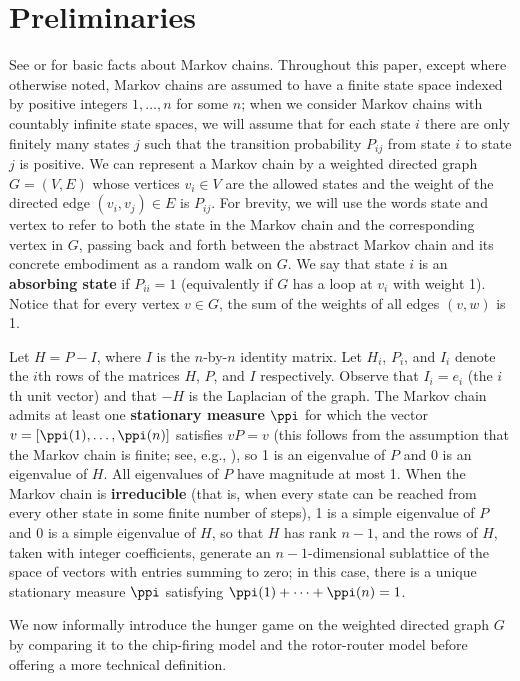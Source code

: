 \section{Preliminaries}\label{section: preliminaries}
See \cite{kemenysnell1983} or \cite{norris1998markov}
for basic facts about Markov chains.
Throughout this paper, except where otherwise noted, 
Markov chains are assumed to have a finite state space
indexed by positive integers $1,\dots,n$ for some $n$; 
when we consider Markov chains with countably infinite state spaces, 
we will assume that for each state $i$
there are only finitely many states $j$ such that 
the transition probability $P_{ij}$ from state $i$ to state $j$ is positive.
We can represent a Markov chain by a weighted directed graph $G=(V,E)$ 
whose vertices $v_i \in V$ are the allowed states 
and the weight of the directed edge $(v_i,v_j) \in E$ is $P_{ij}$.
For brevity, we will use the words state and vertex to refer to 
both the state in the Markov chain and the corresponding vertex in $G$,
passing back and forth between the abstract Markov chain
and its concrete embodiment as a random walk on $G$.
We say that state $i$ is an \textbf{absorbing state} if $P_{ii}=1$
(equivalently if $G$ has a loop at $v_i$ with weight 1).
Notice that for every vertex $v \in G$, 
the sum of the weights of all edges $(v,w)$ is 1. 

Let $H=P-I$, where $I$ is the $n$-by-$n$ identity matrix.
Let $H_i$, $P_i$, and $I_i$ denote the $i$th rows 
of the matrices $H$, $P$, and $I$ respectively.
Observe that $I_i = e_i$ (the $i$th unit vector)
and that $-H$ is the Laplacian of the graph.
The Markov chain admits at least one \textbf{stationary measure} $\ppi$
for which the vector $v = [\ppi(1),\dots,\ppi(n)]$ satisfies $vP=v$
(this follows from the assumption that the Markov chain is finite;
see, e.g., \cite{norris1998markov}),
so 1 is an eigenvalue of $P$ and 0 is an eigenvalue of $H$.
All eigenvalues of $P$ have magnitude at most 1.
When the Markov chain is \textbf{irreducible}
(that is, when every state can be reached from every other state
in some finite number of steps), 1 is a simple eigenvalue of $P$
and 0 is a simple eigenvalue of $H$,
so that $H$ has rank $n-1$,
and the rows of $H$, taken with integer coefficients,
generate an $n-1$-dimensional sublattice of the 
space of vectors with entries summing to zero;
in this case, there is a unique stationary measure $\ppi$
satisfying $\ppi(1)+\cdots+\ppi(n) = 1$.

We now informally introduce the hunger game on the weighted directed graph $G$
by comparing it to the chip-firing model and the rotor-router model
before offering a more technical definition.

